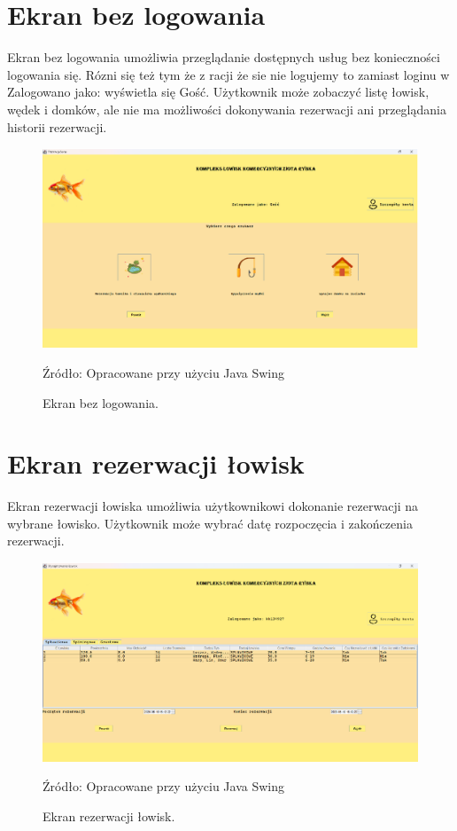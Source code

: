 \section{Ekran bez logowania}
Ekran bez logowania umożliwia przeglądanie dostępnych usług bez konieczności logowania się. Rózni się też tym że z racji że sie nie logujemy to zamiast loginu w Zalogowano jako: wyświetla się Gość. Użytkownik może zobaczyć listę łowisk, wędek i domków, ale nie ma możliwości dokonywania rezerwacji ani przeglądania historii rezerwacji.
\begin{figure}[H]
    \centering
    \includegraphics[width=0.8\linewidth]{figures/without.eps}
    \caption{Ekran bez logowania.}
    \label{fig:without_login_screen}
    \small{Źródło: Opracowane przy użyciu Java Swing}
\end{figure}
\clearpage

\section{Ekran rezerwacji łowisk}
Ekran rezerwacji łowiska umożliwia użytkownikowi dokonanie rezerwacji na wybrane łowisko. Użytkownik może wybrać datę rozpoczęcia i zakończenia rezerwacji.
\begin{figure}[H]
    \centering
    \includegraphics[width=0.8\linewidth]{figures/lakes.eps}
    \caption{Ekran rezerwacji łowisk.}
    \label{fig:lakes_screen}
    \small{Źródło: Opracowane przy użyciu Java Swing}
\end{figure}
\clearpage

